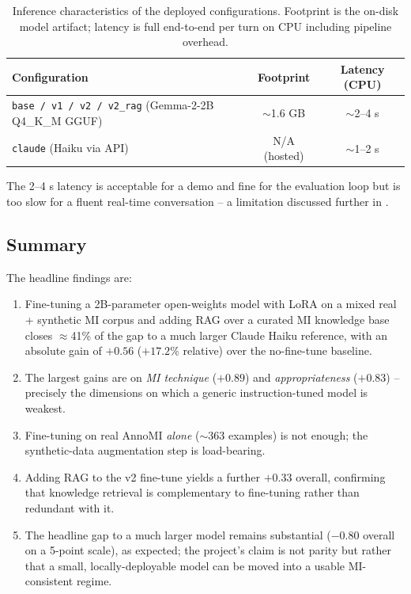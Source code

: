 \begin{table}[h]
\centering
\caption{Inference characteristics of the deployed configurations.
Footprint is the on-disk model artifact; latency is full end-to-end per turn
on CPU including pipeline overhead.}
\label{tab:latency}
\begin{tabular}{lcc}
\toprule
\textbf{Configuration} & \textbf{Footprint} & \textbf{Latency (CPU)} \\
\midrule
\texttt{base / v1 / v2 / v2\_rag} (Gemma-2-2B Q4\_K\_M GGUF) & $\sim$1.6 GB & $\sim$2--4 s \\
\texttt{claude} (Haiku via API)                              & N/A (hosted) & $\sim$1--2 s \\
\bottomrule
\end{tabular}
\end{table}

The 2--4 s latency is acceptable for a demo and fine for the evaluation loop
but is too slow for a fluent real-time conversation -- a limitation discussed
further in .

\subsection{Summary}

The headline findings are:
\begin{enumerate}
    \item Fine-tuning a 2B-parameter open-weights model with LoRA on a mixed
    real + synthetic MI corpus and adding RAG over a curated MI knowledge base
    closes $\approx$41\% of the gap to a much larger Claude Haiku reference,
    with an absolute gain of $+0.56$ ($+17.2\%$ relative) over the
    no-fine-tune baseline.
    \item The largest gains are on \emph{MI technique} ($+0.89$) and
    \emph{appropriateness} ($+0.83$) -- precisely the dimensions on which a
    generic instruction-tuned model is weakest.
    \item Fine-tuning on real AnnoMI \emph{alone} ($\sim$363 examples) is
    not enough; the synthetic-data augmentation step is load-bearing.
    \item Adding RAG to the v2 fine-tune yields a further $+0.33$ overall,
    confirming that knowledge retrieval is complementary to fine-tuning rather
    than redundant with it.
    \item The headline gap to a much larger model remains substantial
    ($-0.80$ overall on a 5-point scale), as expected; the project's claim is
    not parity but rather that a small, locally-deployable model can be moved
    into a usable MI-consistent regime.
\end{enumerate}
